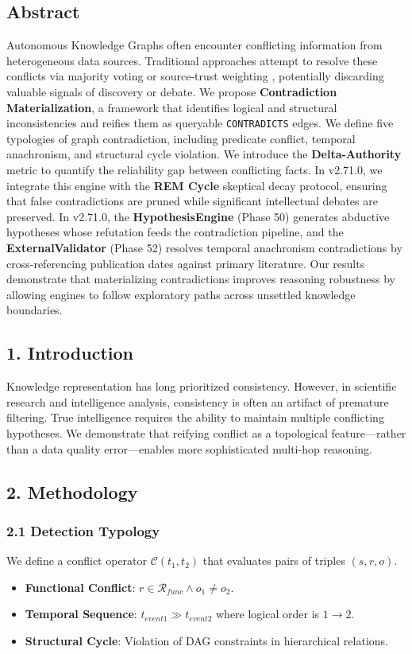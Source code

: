 
\subsection*{Abstract}
Autonomous Knowledge Graphs often encounter conflicting information from heterogeneous data sources. Traditional approaches attempt to resolve these conflicts via majority voting or source-trust weighting \cite{dong2014knowledgevault, bertossi2011database}, potentially discarding valuable signals of discovery or debate. We propose \textbf{Contradiction Materialization}, a framework that identifies logical and structural inconsistencies and reifies them as queryable \texttt{CONTRADICTS} edges. We define five typologies of graph contradiction, including predicate conflict, temporal anachronism, and structural cycle violation. We introduce the \textbf{Delta-Authority} metric to quantify the reliability gap between conflicting facts. In v2.71.0, we integrate this engine with the \textbf{REM Cycle} skeptical decay protocol, ensuring that false contradictions are pruned while significant intellectual debates are preserved. In v2.71.0, the \textbf{HypothesisEngine} (Phase 50) generates abductive hypotheses whose refutation feeds the contradiction pipeline, and the \textbf{ExternalValidator} (Phase 52) resolves temporal anachronism contradictions by cross-referencing publication dates against primary literature. Our results demonstrate that materializing contradictions improves reasoning robustness by allowing engines to follow exploratory paths across unsettled knowledge boundaries.

\subsection*{1. Introduction}
Knowledge representation has long prioritized consistency. However, in scientific research and intelligence analysis, consistency is often an artifact of premature filtering. True intelligence requires the ability to maintain multiple conflicting hypotheses. We demonstrate that reifying conflict as a topological feature---rather than a data quality error---enables more sophisticated multi-hop reasoning.

\subsection*{2. Methodology}

\subsubsection*{2.1 Detection Typology}
We define a conflict operator $\mathcal{C}(t_1, t_2)$ that evaluates pairs of triples $(s, r, o)$.
\begin{itemize}
  \item \textbf{Functional Conflict}: $r \in \mathcal{R}_{func} \land o_1 \neq o_2$.
  \item \textbf{Temporal Sequence}: $t_{event1} \gg t_{event2}$ where logical order is $1 \to 2$.
  \item \textbf{Structural Cycle}: Violation of DAG constraints in hierarchical relations.
\end{itemize}


